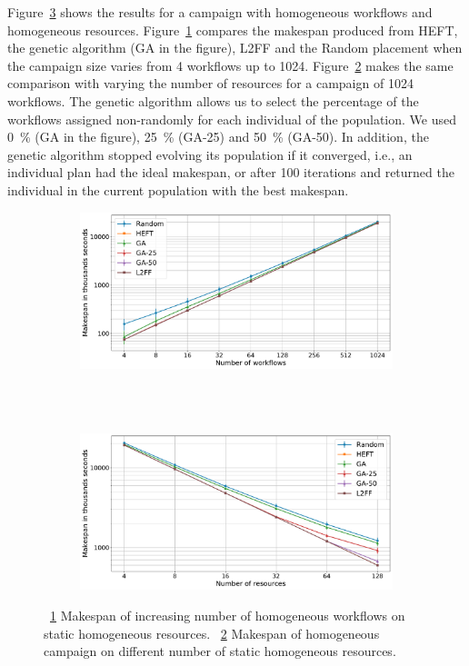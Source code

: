 Figure~\ref{fig:st_homog_analysis} shows the results for a campaign with homogeneous workflows and homogeneous resources.
Figure~\ref{fig:StHomoCampaigns_4StHomoResources} compares the makespan produced from HEFT, the genetic algorithm (GA in the figure), L2FF and the Random placement when the campaign size varies from 4 workflows up to 1024.
Figure~\ref{fig:StHomoResources_StHomoCampaigns} makes the same comparison with varying the number of resources for a campaign of 1024 workflows.
The genetic algorithm allows us to select the percentage of the workflows assigned non-randomly for each individual of the population.
We used 0~\% (GA in the figure), 25~\% (GA-25) and 50~\% (GA-50).
In addition, the genetic algorithm stopped evolving its population if it converged, i.e., an individual plan had the ideal makespan, or after 100 iterations and returned the individual in the current population with the best makespan.

\begin{figure}[ht!]
    \centering
    \begin{subfigure}[b]{0.85\textwidth}
        \includegraphics[width=.95\textwidth]{figures/campaign/StHomoCampaigns_4StHomoResources.pdf}
        \caption{}
        \label{fig:StHomoCampaigns_4StHomoResources}
    \end{subfigure}\\
    ~ 
    \begin{subfigure}[b]{0.85\textwidth}
        \includegraphics[width=.95\textwidth]{figures/campaign/StHomoResources_StHomoCampaigns.pdf}
        \caption{}
        \label{fig:StHomoResources_StHomoCampaigns}
    \end{subfigure}
    \caption{~\ref{fig:StHomoCampaigns_4StHomoResources} Makespan of increasing number of homogeneous workflows on static homogeneous resources.
    ~\ref{fig:StHomoResources_StHomoCampaigns} Makespan of homogeneous campaign on different number of static homogeneous resources.}
    \label{fig:st_homog_analysis}
\end{figure}

